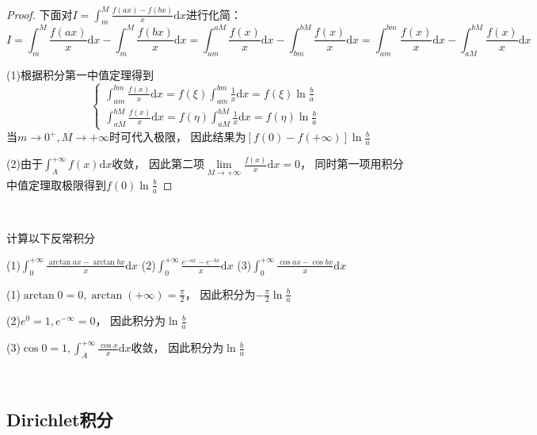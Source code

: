 \begin{proof}
  下面对$I = \int_m^M \frac{f(ax) - f(bx)}{x}\mathrm{d} x$进行化简：
  \begin{equation*}
    I = \int_m^M \frac{f(ax)}{x}\mathrm{d} x - \int _m^M \frac{f(bx)}{x}\mathrm{d} x = \int_{am}^{aM}\frac{f(x)}{x}\mathrm{d} x - \int_{bm}^{bM} \frac{f(x)}{x}\mathrm{d} x = \int _{am}^{bm} \frac{f(x)}{x}\mathrm{d} x - \int_{aM}^{bM}\frac{f(x)}{x}\mathrm{d} x
  \end{equation*}

  (1)根据积分第一中值定理得到
  \begin{equation*}
    \begin{cases}
      \int_{am}^{bm} \frac{f(x)}{x} \mathrm{d} x = f(\xi) \int_{am}^{bm} \frac{1}{x}\mathrm{d} x = f(\xi) \ln \frac{b}{a}\\
      \int_{aM}^{bM} \frac{f(x)}{x}\mathrm{d} x = f(\eta) \int_{aM}^{bM} \frac{1}{x}\mathrm{d} x = f(\eta) \ln \frac{b}{a}
    \end{cases}
  \end{equation*}
  当$m \rightarrow 0^+, M \rightarrow +\infty$时可代入极限，
  因此结果为$[f(0) - f(+\infty)] \ln \frac{b}{a}$

  (2)由于$\int_A^{+\infty}f(x)\mathrm{d} x$收敛，
  因此第二项$\lim \limits _{M \rightarrow +\infty} \frac{f(x)}{x}\mathrm{d} x = 0$，
  同时第一项用积分中值定理取极限得到$f(0) \ln \frac{b}{a}$
\end{proof}

~

\begin{exercise}[富如兰尼积分的应用]
  计算以下反常积分

  (1)$\int_0^{+\infty} \frac{\arctan ax - \arctan bx}{x}\mathrm{d} x$
  (2)$\int_0^{+\infty} \frac{e^{-ax} - e^{-bx}}{x}\mathrm{d} x$
  (3)$\int_0^{+\infty} \frac{\cos ax - \cos bx}{x}\mathrm{d} x$
\end{exercise}

\begin{solution}
  (1)$\arctan 0 = 0, \arctan (+\infty) = \frac{\pi}{2}$，
  因此积分为$- \frac{\pi}{2} \ln \frac{b}{a}$

  (2)$e^0 = 1, e^{- \infty} = 0$，
  因此积分为$\ln \frac{b}{a}$

  (3)$\cos 0 = 1, \int _A^{+\infty} \frac{\cos x}{x}\mathrm{d} x$收敛，
  因此积分为$\ln \frac{b}{a}$
\end{solution}


~


\subsection{Dirichlet积分}

